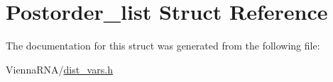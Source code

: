\hypertarget{structPostorder__list}{\section{Postorder\-\_\-list Struct Reference}
\label{structPostorder__list}
}


The documentation for this struct was generated from the following file\-:\begin{DoxyCompactItemize}
\item 
Vienna\-R\-N\-A/\hyperlink{dist__vars_8h}{dist\-\_\-vars.\-h}\end{DoxyCompactItemize}
